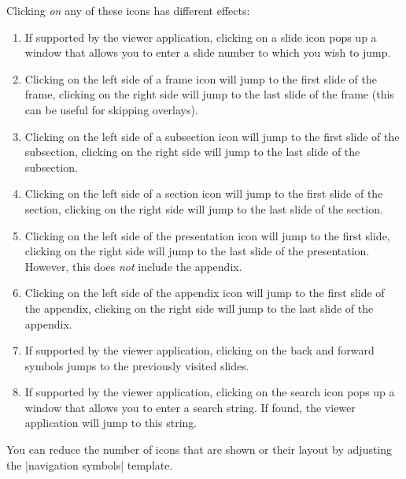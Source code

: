 Clicking \emph{on} any of these icons has different effects:
\begin{enumerate}
\item
  If supported by the viewer application, clicking on a slide icon pops up a window that allows you to enter a slide number to which you wish to jump.
\item
  Clicking on the left side of a frame icon will jump to the first slide of the frame, clicking on the right side will jump to the last slide of the frame (this can be useful for skipping overlays).
\item
  Clicking on the left side of a subsection icon will jump to the first slide of the subsection, clicking on the right side will jump to the last slide of the subsection.
\item
  Clicking on the left side of a section icon will jump to the first slide of the section, clicking on the right side will jump to the last slide of the section.
\item
  Clicking on the left side of the presentation icon will jump to the first slide, clicking on the right side will jump to the last slide of the presentation. However, this does \emph{not} include the appendix.
\item
  Clicking on the left side of the appendix icon will jump to the first slide of the appendix, clicking on the right side will jump to the last slide of the appendix.
\item
  If supported by the viewer application, clicking on the back and forward symbols jumps to the previously visited slides.
\item
  If supported by the viewer application, clicking on the search icon pops up a window that allows you to enter a search string. If found, the viewer application will jump to this string.
\end{enumerate}

You can reduce the number of icons that are shown or their layout by adjusting the |navigation symbols| template.

